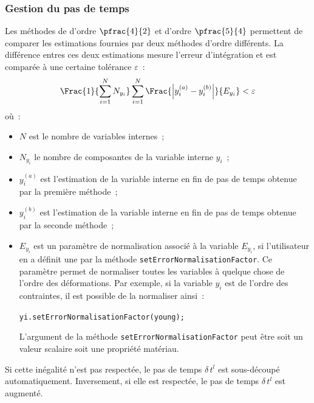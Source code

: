 \documentclass[rectoverso,pleiades,pstricks,leqno,anti]{texmf/note_technique_2010}
\begin{document}
\subsubsection{Gestion du pas de temps}

Les méthodes de  d'ordre $\pfrac{4}{2}$ et d'ordre
$\pfrac{5}{4}$ permettent de comparer les estimations fournies par deux
méthodes d'ordre différents. La différence entres ces deux estimations
mesure l'erreur d'intégration et est comparée à une certaine tolérance
\(\varepsilon\)~:
\begin{equation}
  \label{eq:RK:epsilon}
  \Frac{1}{\displaystyle\sum_{i=1}^{N}N_{y_{i}}}\displaystyle\sum_{i=1}^{N}\Frac{\left|
 y_{i}^{(a)}-y_{i}^{(b)}\right|}{E_{y_{i}}}<\varepsilon
\end{equation}
où~:
\begin{minipage}[t]{0.9\linewidth}
  \begin{itemize}
    \item \(N\) est le nombre de variables internes~;
    \item \(N_{y_{i}}\) le nombre de composantes de la variable interne
    \(y_{i}\)~;
    \item \(y_{i}^{(a)}\) est l'estimation de la variable interne en fin
    de pas de temps obtenue par la première méthode~;
    \item \(y_{i}^{(b)}\) est l'estimation de la variable interne en fin
    de pas de temps obtenue par la seconde méthode~;
    \item \(E_{y_{i}}\) est un paramètre de normalisation associé à la
    variable \(E_{y_{i}}\), si l'utilisateur en a définit une par la
    méthode \texttt{set\-Error\-Norma\-lisa\-tion\-Factor}. Ce paramètre
    permet de normaliser toutes les variables à quelque chose de l'ordre
    des déformations. Par exemple, si la variable \(y_{i}\) est de
    l'ordre des contraintes, il est possible de la normaliser ainsi~:
    \begin{center}
      \texttt{yi.setErrorNormalisationFactor(young);}
    \end{center}
    L'argument de la méthode
    \texttt{set\-Error\-Norma\-lisa\-tion\-Factor} peut être soit un
    valeur scalaire soit une propriété matériau.
  \end{itemize}
\end{minipage}

Si cette inégalité n'est pas respectée, le pas de temps
\(\delta\,t^{l}\) est sous-découpé automatiquement. Inversement, si elle
est respectée, le pas de temps \(\delta\,t^{l}\) est augmenté.
\end{document}
